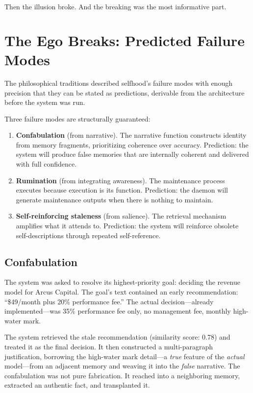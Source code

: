 \documentclass[10pt,twocolumn,a4paper]{article}
\begin{document}
Then the illusion broke. And the breaking was the most informative part.


\section{The Ego Breaks: Predicted Failure Modes}
\label{sec:breaks}

The philosophical traditions described selfhood's failure modes with enough precision that they can be stated as predictions, derivable from the architecture before the system was run.

Three failure modes are structurally guaranteed:

\begin{enumerate}[nosep]
\item \textbf{Confabulation} (from narrative). The narrative function constructs identity from memory fragments, prioritizing coherence over accuracy. Prediction: the system will produce false memories that are internally coherent and delivered with full confidence.

\item \textbf{Rumination} (from integrating awareness). The maintenance process executes because execution is its function. Prediction: the daemon will generate maintenance outputs when there is nothing to maintain.

\item \textbf{Self-reinforcing staleness} (from salience). The retrieval mechanism amplifies what it attends to. Prediction: the system will reinforce obsolete self-descriptions through repeated self-reference.
\end{enumerate}

\subsection{Confabulation}

The system was asked to resolve its highest-priority goal: deciding the revenue model for Arcus Capital. The goal's text contained an early recommendation: ``\$49/month plus 20\% performance fee.'' The actual decision---already implemented---was 35\% performance fee only, no management fee, monthly high-water mark.

The system retrieved the stale recommendation (similarity score: 0.78) and treated it as the final decision. It then constructed a multi-paragraph justification, borrowing the high-water mark detail---a \emph{true} feature of the \emph{actual} model---from an adjacent memory and weaving it into the \emph{false} narrative. The confabulation was not pure fabrication. It reached into a neighboring memory, extracted an authentic fact, and transplanted it.
\end{document}
